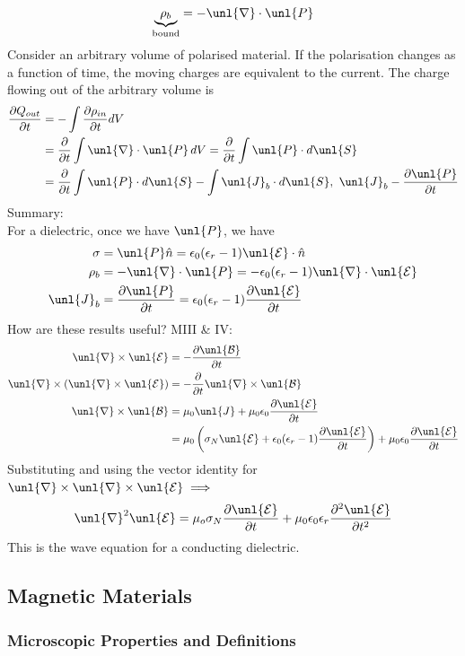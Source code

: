 \documentclass[a4paper, 11pt, normalem]{report}
\newcommand\p{\partial}
\newcommand\E{\mathcal{E}}
\newcommand\uE{\unl{\E}}
\newcommand\B{\mathcal{B}}
\newcommand\uB{\unl{\B}}
\newcommand\del{\unl{\nabla}}
\newcommand\eno{\epsilon_0}
\newcommand\hn{\hat{n}}
\newcommand\J{\unl{J}}
\newcommand\er{\epsilon_r}
\begin{document}
\chapter{}
\begin{equation}
    \underbrace{\rho_b}_{\text{bound}} = -\del\cdot\unl{P}
\end{equation}
Consider an arbitrary volume of polarised material.
If the polarisation changes as a function of time, the moving charges are equivalent to the current.
The charge flowing out of the arbitrary volume is
\begin{align}
    \frac{\p Q_{out}}{\p t} &= -\int \frac{\p \rho_{in}}{\p t}dV \\
    &= \frac{\p}{\p t} \int \del\cdot\unl{P}\,dV = \frac{\p}{\p t}\int \unl{P}\cdot d\unl{S} \\
    &= \frac{\p}{\p t} \int \unl{P} \cdot d\unl{S} - \int \J_b \cdot d\unl{S}, ~ \J_b - \frac{\p \unl{P}}{\p t}
\end{align}
Summary: \\
For a dielectric, once we have $\unl{P}$, we have
\begin{align}
    \sigma &= \unl{P}\hn = \eno(\er - 1)\uE\cdot \hn \\
    \rho_b &= -\del\cdot\unl{P} = -\eno(\er - 1)\del\cdot\uE \\
    \J_b &= \frac{\p \unl{P}}{\p t} = \eno(\er - 1)\frac{\p\uE}{\p t}
\end{align}
How are these results useful? M\RN{3} \& \RN{4}:
\begin{align}
    \del\times\uE &= -\frac{\p\uB}{\p t} \\
    \del\times(\del\times\uE) &= -\frac{\p}{\p t}\del\times\uB \\
    \del\times\uB &= \mu_0\J + \mu_0\eno\frac{\p \uE}{\p t} \\
    &=\mu_0\left(\sigma_N\uE + \eno(\er - 1)\frac{\p\uE}{\p t}\right) + \mu_0\eno\frac{\p \uE}{\p t}
\end{align}
Substituting and using the vector identity for $\del\times\del\times\uE \implies$
\begin{equation}
    \del^2\uE = \mu_o\sigma_N \frac{\p\uE}{\p t} + \mu_0\eno\er\frac{\p^2\uE}{\p t^2}
\end{equation}
This is the wave equation for a conducting dielectric.

\section{Magnetic Materials}
\subsection{Microscopic Properties and Definitions}
\end{document}
